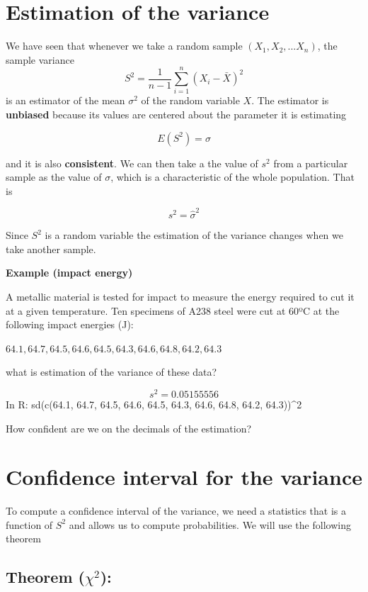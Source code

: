 \documentclass[
]{book}
\begin{document}
\hypertarget{estimation-of-the-variance}{%
\section{Estimation of the variance}\label{estimation-of-the-variance}}

We have seen that whenever we take a random sample \((X_1, X_2, ... X_n)\), the sample variance
\[S^2=\frac{1}{n-1}\sum_{i=1}^n (X_i-\bar{X})^2\]
is an estimator of the mean \(\sigma^2\) of the random variable \(X\). The estimator is \textbf{unbiased} because its values are centered about the parameter it is estimating

\[E(S^2)=\sigma\]

and it is also \textbf{consistent}. We can then take a the value of \(s^2\) from a particular sample as the value of \(\sigma\), which is a characteristic of the whole population. That is

\[s^2=\hat{\sigma}^2\]

Since \(S^2\) is a random variable the estimation of the variance changes when we take another sample.

\textbf{Example (impact energy)}

A metallic material is tested for impact to measure the energy required to cut it at a given temperature. Ten specimens of A238 steel were cut at 60ºC at the following impact energies (J):

\(64.1, 64.7, 64.5, 64.6, 64.5, 64.3, 64.6, 64.8, 64.2, 64.3\)

what is estimation of the variance of these data?

\[s^2=0.05155556\]
In R: sd(c(64.1, 64.7, 64.5, 64.6, 64.5, 64.3, 64.6, 64.8, 64.2, 64.3))\^{}2

How confident are we on the decimals of the estimation?

\hypertarget{confidence-interval-for-the-variance}{%
\section{Confidence interval for the variance}\label{confidence-interval-for-the-variance}}

To compute a confidence interval of the variance, we need a statistics that is a function of \(S^2\) and allows us to compute probabilities. We will use the following theorem

\hypertarget{theorem-chi2}{%
\subsection{\texorpdfstring{Theorem (\(\chi^2\)):}{Theorem (\textbackslash chi\^{}2):}}\label{theorem-chi2}}
\end{document}

